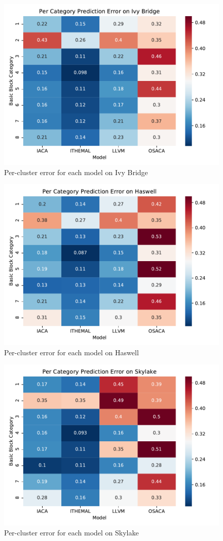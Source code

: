 \begin{figure}
\includegraphics[width=\columnwidth]{figures/ivb-cluster-err.pdf}
\caption{Per-cluster error for each model on Ivy Bridge}
\label{fig:ivb-cluster-err}
\end{figure}

\begin{figure}
\includegraphics[width=\columnwidth]{figures/hsw-cluster-err.pdf}
\caption{Per-cluster error for each model on Haswell}
\label{fig:hsw-cluster-err}
\end{figure}

\begin{figure}
\includegraphics[width=\columnwidth]{figures/skl-cluster-err.pdf}
\caption{Per-cluster error for each model on Skylake}
\label{fig:skl-cluster-err}
\end{figure} 
